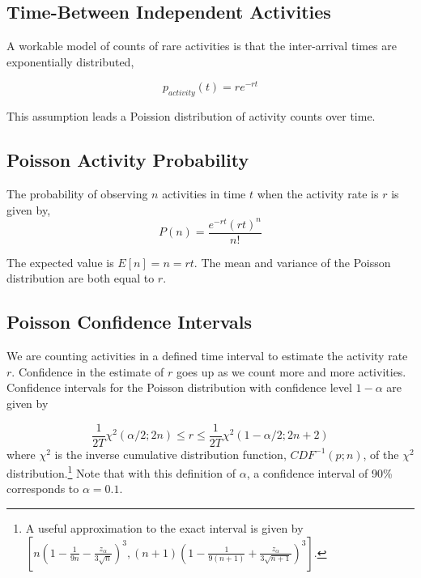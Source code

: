 \documentclass{article}
\begin{document}
\subsection{Time-Between Independent Activities} %

A workable model of counts of rare activities is that the inter-arrival times are exponentially distributed, 

\begin{equation}
    \label{eq:tbe}
    p_{activity}(t) = r e^{-r t}
\end{equation}

This assumption leads a Poission distribution of activity counts over time.

\subsection{Poisson Activity Probability} %

The probability of observing $n$ activities in time $t$ when the activity rate is $r$ is given by,
\begin{equation}
    \label{eq:poisson}
    P(n) = \frac{e^{-r t} (r t)^n}{n!}
\end{equation}

The expected value is $E[n]=n=rt$. The mean and variance of the Poisson distribution are both equal to $r$.

\subsection{Poisson Confidence Intervals} %

We are counting activities in a defined time interval to estimate the activity rate $r$.  Confidence in the estimate of $r$ goes up as we count more and more activities. Confidence intervals for the Poisson distribution with confidence level $1-\alpha$ are given by

\begin{equation}
    \label{eq:chisqconf}
    \frac{1}{2T} \chi^2(\alpha/2;2n) \leq r \leq \frac{1}{2T} \chi^2(1-\alpha/2;2n+2)
\end{equation}
where $\chi^2$ is the inverse cumulative distribution function, $CDF^{-1}(p; n)$, of the $\chi^2$ distribution.\footnote{A useful approximation to the exact interval is given by  $[ n(1 - \frac{1}{9n} - \frac{z_{\alpha}}{3\sqrt{n}})^3 , (n+1)(1- \frac{1}{9(n+1)} + \frac{z_{\alpha}}{3\sqrt{n+1}})^3]$. }
Note that with this definition of $\alpha$, a confidence interval of 90\% corresponds to $\alpha=0.1$.
\end{document}
